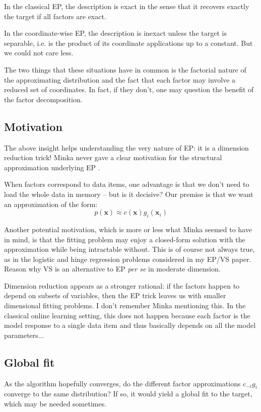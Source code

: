\documentclass{article}
\def\x{{\mathbf{x}}}
\begin{document}
In the classical EP, the description is exact in the sense that it recovers exactly the target if all factors are exact.

In the coordinate-wise EP, the description is inexact unless the target is separable, i.e. is the product of its coordinate applications up to a constant. But we could not care less.

The two things that these situations have in common is the factorial nature of the approximating distribution and the fact that each factor may involve a reduced set of coordinates. In fact, if they don't, one may question the benefit of the factor decomposition.


\subsection{Motivation}

The above insight helps understanding the very nature of EP: it is a dimension reduction trick! Minka never gave a clear motivation for the structural approximation underlying EP \cite{Minka-01,Minka-05}. 

When factors correspond to data items, one advantage is that we don't need to load the whole data in memory -- but is it decisive? Our premise is that we want an approximation of the form: 
$$
p(\x) 
\approx
c(\x) g_i(\x_i)
$$

Another potential motivation, which is more or less what Minka seemed to have in mind, is that the fitting problem may enjoy a closed-form solution with the approximation while being intractable without. This is of course not always true, as in the logistic and hinge regression problems considered in my EP/VS paper. Reason why VS is an alternative to EP {\em per se} in moderate dimension.

Dimension reduction appears as a stronger rational: if the factors happen to depend on subsets of variables, then the EP trick leaves us with smaller dimensional fitting problems. I don't remember Minka mentioning this. In the classical online learning setting, this does not happen because each factor is the model response to a single data item and thus basically depends on all the model parameters...

\subsection{Global fit}

As the algorithm hopefully converges, do the different factor approximations $c_{-i}g_i$ converge to the same distribution? If so, it would yield a global fit to the target, which may be needed sometimes. 
\end{document}
